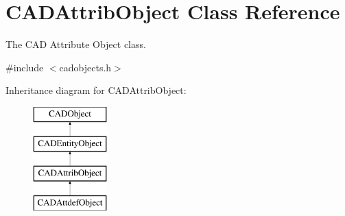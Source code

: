 \hypertarget{class_c_a_d_attrib_object}{}\section{C\+A\+D\+Attrib\+Object Class Reference}
\label{class_c_a_d_attrib_object}


The C\+AD Attribute Object class.  




{\ttfamily \#include $<$cadobjects.\+h$>$}

Inheritance diagram for C\+A\+D\+Attrib\+Object\+:\begin{figure}[H]
\begin{center}
\leavevmode
\includegraphics[height=4.000000cm]{class_c_a_d_attrib_object}
\end{center}
\end{figure}
